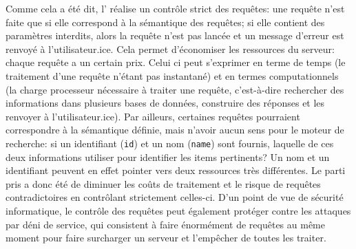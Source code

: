 Comme cela a été dit, l'\api{} réalise un contrôle strict des requêtes: une requête n'est faite que si elle correspond à la sémantique des requêtes; si elle contient des paramètres interdits, alors la requête n'est pas lancée et un message d'erreur est renvoyé à l'utilisateur.ice. Cela permet d'économiser les ressources du serveur: chaque requête a un certain prix. Celui ci peut s'exprimer en terme de temps (le traitement d'une requête n'étant pas instantané) et en termes computationnels (la charge processeur nécessaire à traiter une requête, c'est-à-dire rechercher des informations dans plusieurs bases de données, construire des réponses et les renvoyer à l'utilisateur.ice). Par ailleurs, certaines requêtes pourraient correspondre à la sémantique définie, mais n'avoir aucun sens pour le moteur de recherche: si un identifiant (\texttt{id}) et un nom (\texttt{name}) sont fournis, laquelle de ces deux informations utiliser pour identifier les items pertinents? Un nom et un identifiant peuvent en effet pointer vers deux ressources très différentes. Le parti pris a donc été de diminuer les coûts de traitement et le risque de requêtes contradictoires en contrôlant strictement celles-ci. D'un point de vue de sécurité informatique, le contrôle des requêtes peut également protéger contre les attaques par déni de service, qui consistent à faire énormément de requêtes au même moment pour faire surcharger un serveur et l'empêcher de toutes les traiter.

